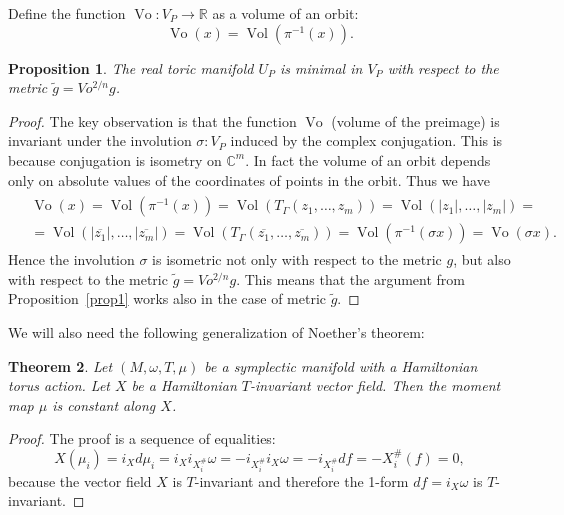 \documentclass[jsg]{IP_v1_forauthors}
\def\Vo{\mathop{\mathrm{Vo}}}
\def\Vol{\mathop{\mathrm{Vol}}}
\newtheorem{theo}{Theorem}[section]
\newtheorem{prop}[theo]{Proposition}
\theoremstyle{definition}
\newtheorem{rema}[theo]{Remark}
\numberwithin{equation}{section}
\begin{document}
Define the function $\Vo \colon V_P \rightarrow {\mathbb R}$ as a volume of an orbit: 
\begin{equation}
\Vo(x)=\Vol(\pi^{-1}(x)).
\end{equation}
\begin{prop}\label{prop2}
The real toric manifold $U_P$ is minimal in $V_P$ with respect to the metric $\tilde{g}=Vo^{2/n} g$.
\end{prop}
\begin{proof}
The key observation is that the function $\Vo$ (volume of the preimage) is invariant under the involution $\sigma \colon V_P$ induced by the complex conjugation. This is because conjugation is isometry on $\mathbb{C}^m$. In fact the volume of an orbit depends only on absolute values of the coordinates of points in the orbit. Thus we have
\begin{align}
\begin{split}
& \Vo(x)=\Vol(\pi^{-1}(x))=\Vol(T_\Gamma(z_1,\ldots ,z_m))=\Vol(|z_1|,\ldots,|z_m|)=\\
&=\Vol(|\overline{z_1}|,\ldots,|\overline{z_m}|)=\Vol(T_\Gamma(\overline{z_1},\ldots ,\overline{z_m}))=\Vol(\pi^{-1}(\sigma x))=\Vo(\sigma x).
\end{split}
\end{align}
Hence the involution $\sigma$ is isometric not only with respect to the metric $g$, but also with respect to the metric $\tilde{g}=Vo^{2/n} g$. This means that the argument from Proposition~\ref{prop1} works also in the case of metric $\tilde{g}$.
\end{proof}


We will also need the following generalization of Noether's theorem:
\begin{theo}\label{theo4.3}
Let $(M,\omega,T,\mu)$ be a symplectic manifold with a Hamiltonian torus action. Let $X$ be a Hamiltonian $T$-invariant vector field. Then the moment map $\mu$ is constant along $X$.
\end{theo}
\begin{proof}
The proof is a sequence of equalities:
\begin{equation}
X(\mu_i) =i_X d \mu_i=  i_X i_{X^{\#}_i} \omega = - i_{X^\#_i} i_X \omega = - i_{X^\#_i}  d f = - X^\#_i(f) = 0,
\end{equation}
because the vector field $X$ is $T$-invariant and therefore the 1-form ${d}f=i_X \omega$ is $T$-invariant.
\end{proof}
\end{document}
